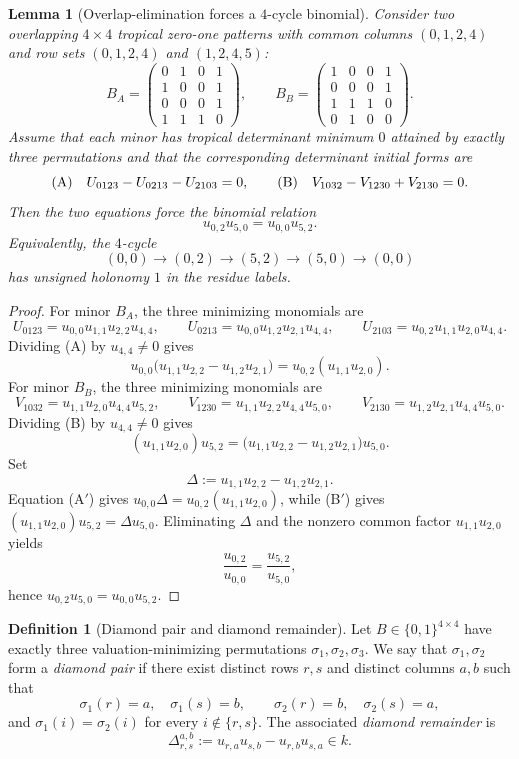\documentclass[11pt]{amsart}
\numberwithin{equation}{section}
\theoremstyle{plain}
\newtheorem{lemma}[theorem]{Lemma}
\theoremstyle{definition}
\newtheorem{definition}[theorem]{Definition}
\theoremstyle{remark}
\begin{document}
\begin{lemma}[Overlap-elimination forces a $4$-cycle binomial]
\label{lem:overlap-elimination}
Consider two overlapping $4\times4$ tropical zero-one patterns with common columns $(0,1,2,4)$ and row sets
$(0,1,2,4)$ and $(1,2,4,5)$:
\[
B_A=
\begin{pmatrix}
0&1&0&1\\
1&0&0&1\\
0&0&0&1\\
1&1&1&0
\end{pmatrix},
\qquad
B_B=
\begin{pmatrix}
1&0&0&1\\
0&0&0&1\\
1&1&1&0\\
0&1&0&0
\end{pmatrix}.
\]
Assume that each minor has tropical determinant minimum $0$ attained by exactly three permutations and that the corresponding
determinant initial forms are
\[
\textup{(A)}\quad U_{0123}-U_{0213}-U_{2103}=0,
\qquad
\textup{(B)}\quad V_{1032}-V_{1230}+V_{2130}=0.
\]
Then the two equations force the binomial relation
\[
u_{0,2}u_{5,0}=u_{0,0}u_{5,2}.
\]
Equivalently, the $4$-cycle
\[
(0,0)\to(0,2)\to(5,2)\to(5,0)\to(0,0)
\]
has unsigned holonomy $1$ in the residue labels.
\end{lemma}

\begin{proof}
For minor $B_A$, the three minimizing monomials are
\[
U_{0123}=u_{0,0}u_{1,1}u_{2,2}u_{4,4},
\qquad
U_{0213}=u_{0,0}u_{1,2}u_{2,1}u_{4,4},
\qquad
U_{2103}=u_{0,2}u_{1,1}u_{2,0}u_{4,4}.
\]
Dividing \textup{(A)} by $u_{4,4}\neq 0$ gives
\[
u_{0,0}\bigl(u_{1,1}u_{2,2}-u_{1,2}u_{2,1}\bigr)=u_{0,2}(u_{1,1}u_{2,0}). \tag{A$'$}
\]
For minor $B_B$, the three minimizing monomials are
\[
V_{1032}=u_{1,1}u_{2,0}u_{4,4}u_{5,2},
\qquad
V_{1230}=u_{1,1}u_{2,2}u_{4,4}u_{5,0},
\qquad
V_{2130}=u_{1,2}u_{2,1}u_{4,4}u_{5,0}.
\]
Dividing \textup{(B)} by $u_{4,4}\neq 0$ gives
\[
(u_{1,1}u_{2,0})u_{5,2}=\bigl(u_{1,1}u_{2,2}-u_{1,2}u_{2,1}\bigr)u_{5,0}. \tag{B$'$}
\]
Set
\[
\Delta:=u_{1,1}u_{2,2}-u_{1,2}u_{2,1}.
\]
Equation \textup{(A$'$)} gives $u_{0,0}\Delta=u_{0,2}(u_{1,1}u_{2,0})$, while \textup{(B$'$)} gives
$(u_{1,1}u_{2,0})u_{5,2}=\Delta u_{5,0}$.
Eliminating $\Delta$ and the nonzero common factor $u_{1,1}u_{2,0}$ yields
\[
\frac{u_{0,2}}{u_{0,0}}=\frac{u_{5,2}}{u_{5,0}},
\]
hence $u_{0,2}u_{5,0}=u_{0,0}u_{5,2}$.
\end{proof}

\begin{definition}[Diamond pair and diamond remainder]
\label{def:diamond-pair}
Let $B\in\{0,1\}^{4\times4}$ have exactly three valuation-minimizing permutations
$\sigma_1,\sigma_2,\sigma_3$. We say that $\sigma_1,\sigma_2$ form a \emph{diamond pair} if there exist distinct rows $r,s$ and
distinct columns $a,b$ such that
\[
\sigma_1(r)=a,\quad \sigma_1(s)=b,\qquad
\sigma_2(r)=b,\quad \sigma_2(s)=a,
\]
and $\sigma_1(i)=\sigma_2(i)$ for every $i\notin\{r,s\}$.
The associated \emph{diamond remainder} is
\[
\Delta_{r,s}^{a,b}:=u_{r,a}u_{s,b}-u_{r,b}u_{s,a}\in k.
\]
\end{definition}
\end{document}

